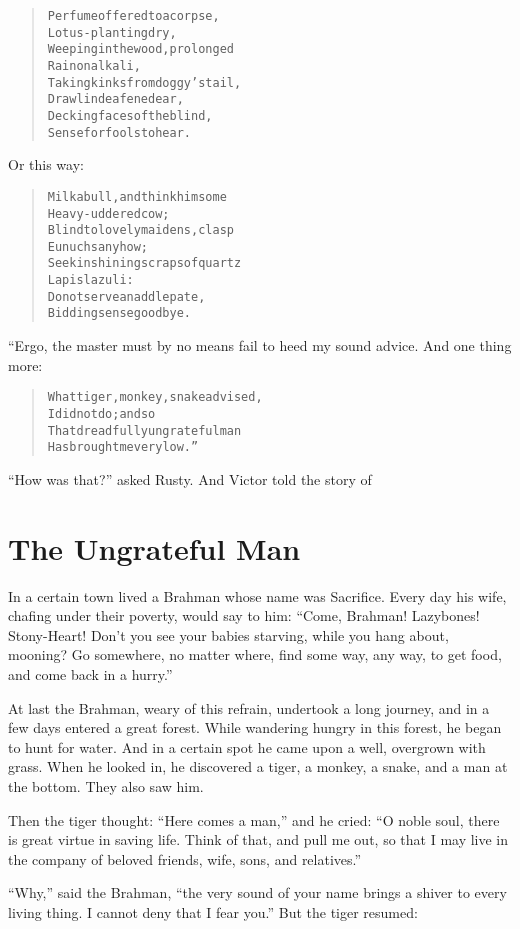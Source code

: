 \documentclass[article, twoside, 14pt]{memoir}
\renewenvironment{verbatim}{%
\begin{quote}%
\vskip -10pt%
\begin{alltt}\normalfont\large}{\end{alltt}%
\end{quote}%
\vskip -10pt
} %
\begin{document}
\begin{verbatim}
Perfume offered to a corpse,
    Lotus-planting dry,
Weeping in the wood, prolonged
    Rain on alkali,
Taking kinks from doggy's tail,
    Drawl in deafened ear,
Decking faces of the blind,
    Sense for fools to hear.
\end{verbatim}
Or this way:

\begin{verbatim}
Milk a bull, and think him some
    Heavy-uddered cow;
Blind to lovely maidens, clasp
    Eunuchs anyhow;
Seek in shining scraps of quartz
    Lapis lazuli:
Do not serve an addlepate,
    Bidding sense goodbye.
\end{verbatim}
“Ergo, the master must by no means fail to heed my sound advice.
And one thing more:

\begin{verbatim}
What tiger, monkey, snake advised,
    I did not do; and so
That dreadfully ungrateful man
    Has brought me very low.”
\end{verbatim}
``How was that?'' asked Rusty. And Victor told the story of

\chapter{The Ungrateful Man}

\label{s12}

In a certain town lived a Brahman whose name was Sacrifice.
Every day his wife, chafing under their poverty, would say to him:
``Come, Brahman! Lazybones! Stony-Heart! Don't you see your babies starving, while you hang about, mooning? Go somewhere, no matter where, find some way, any way, to get food, and come back in a hurry.''

At last the Brahman, weary of this refrain, undertook a long
journey, and in a few days entered a great forest. While wandering
hungry in this forest, he began to hunt for water. And in a certain
spot he came upon a well, overgrown with grass. When he looked in,
he discovered a tiger, a monkey, a snake, and a man at the bottom.
They also saw him.

Then the tiger thought: ``Here comes a man,'' and he cried:
``O noble soul, there is great virtue in saving life. Think of that, and pull me out, so that I may live in the company of beloved friends, wife, sons, and relatives.''

``Why,'' said the Brahman,
``the very sound of your name brings a shiver to every living thing. I cannot deny that I fear you.''
But the tiger resumed:
\end{document}
